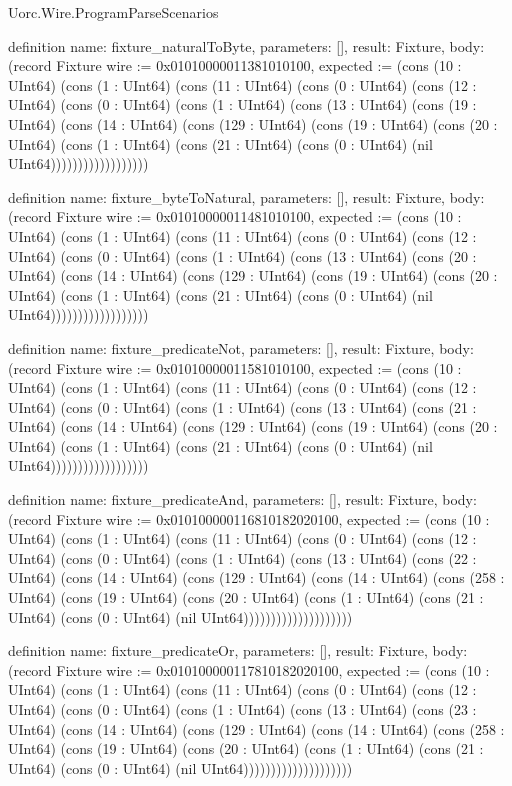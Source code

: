 \begin{lexlean}{Uorc.Wire.ProgramParseScenarios}
\begin{semanticmodule}
definition{
  name: fixture_naturalToByte,
  parameters: [],
  result: Fixture,
  body: (record Fixture {wire := 0x01010000011381010100, expected := (cons (10 : UInt64) (cons (1 : UInt64) (cons (11 : UInt64) (cons (0 : UInt64) (cons (12 : UInt64) (cons (0 : UInt64) (cons (1 : UInt64) (cons (13 : UInt64) (cons (19 : UInt64) (cons (14 : UInt64) (cons (129 : UInt64) (cons (19 : UInt64) (cons (20 : UInt64) (cons (1 : UInt64) (cons (21 : UInt64) (cons (0 : UInt64) (nil UInt64)))))))))))))))))})
}

definition{
  name: fixture_byteToNatural,
  parameters: [],
  result: Fixture,
  body: (record Fixture {wire := 0x01010000011481010100, expected := (cons (10 : UInt64) (cons (1 : UInt64) (cons (11 : UInt64) (cons (0 : UInt64) (cons (12 : UInt64) (cons (0 : UInt64) (cons (1 : UInt64) (cons (13 : UInt64) (cons (20 : UInt64) (cons (14 : UInt64) (cons (129 : UInt64) (cons (19 : UInt64) (cons (20 : UInt64) (cons (1 : UInt64) (cons (21 : UInt64) (cons (0 : UInt64) (nil UInt64)))))))))))))))))})
}

definition{
  name: fixture_predicateNot,
  parameters: [],
  result: Fixture,
  body: (record Fixture {wire := 0x01010000011581010100, expected := (cons (10 : UInt64) (cons (1 : UInt64) (cons (11 : UInt64) (cons (0 : UInt64) (cons (12 : UInt64) (cons (0 : UInt64) (cons (1 : UInt64) (cons (13 : UInt64) (cons (21 : UInt64) (cons (14 : UInt64) (cons (129 : UInt64) (cons (19 : UInt64) (cons (20 : UInt64) (cons (1 : UInt64) (cons (21 : UInt64) (cons (0 : UInt64) (nil UInt64)))))))))))))))))})
}

definition{
  name: fixture_predicateAnd,
  parameters: [],
  result: Fixture,
  body: (record Fixture {wire := 0x010100000116810182020100, expected := (cons (10 : UInt64) (cons (1 : UInt64) (cons (11 : UInt64) (cons (0 : UInt64) (cons (12 : UInt64) (cons (0 : UInt64) (cons (1 : UInt64) (cons (13 : UInt64) (cons (22 : UInt64) (cons (14 : UInt64) (cons (129 : UInt64) (cons (14 : UInt64) (cons (258 : UInt64) (cons (19 : UInt64) (cons (20 : UInt64) (cons (1 : UInt64) (cons (21 : UInt64) (cons (0 : UInt64) (nil UInt64)))))))))))))))))))})
}

definition{
  name: fixture_predicateOr,
  parameters: [],
  result: Fixture,
  body: (record Fixture {wire := 0x010100000117810182020100, expected := (cons (10 : UInt64) (cons (1 : UInt64) (cons (11 : UInt64) (cons (0 : UInt64) (cons (12 : UInt64) (cons (0 : UInt64) (cons (1 : UInt64) (cons (13 : UInt64) (cons (23 : UInt64) (cons (14 : UInt64) (cons (129 : UInt64) (cons (14 : UInt64) (cons (258 : UInt64) (cons (19 : UInt64) (cons (20 : UInt64) (cons (1 : UInt64) (cons (21 : UInt64) (cons (0 : UInt64) (nil UInt64)))))))))))))))))))})
}


\end{semanticmodule}
\end{lexlean}
